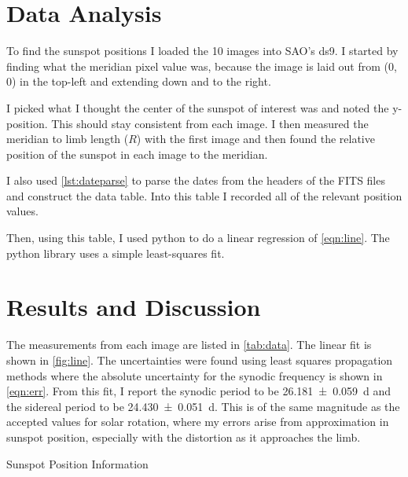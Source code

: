 \documentclass[%
aip,
jmp,
reprint,
floatfix,
]{revtex4-1}
\begin{document}
	\section{Data Analysis}
	To find the sunspot positions I loaded the 10 images into SAO's ds9. I started by finding what the meridian pixel value was, because the image is laid out from (0, 0) in the top-left and extending down and to the right. 
	
	I picked what I thought the center of the sunspot of interest was and noted the y-position. This should stay consistent from each image. I then measured the meridian to limb length ($R$) with the first image and then found the relative position of the sunspot in each image to the meridian. 
	
	I also used \autoref{lst:dateparse} to parse the dates from the headers of the FITS files and construct the data table. Into this table I recorded all of the relevant position values. 
	
	Then, using this table, I used python to do a linear regression of \autoref{eqn:line}. The python library uses a simple least-squares fit. 
	

	\section{Results and Discussion}
	
	The measurements from each image are listed in \autoref{tab:data}. The linear fit is shown in \autoref{fig:line}. The uncertainties were found using least squares propagation methods where the absolute uncertainty for the synodic frequency is shown in \autoref{eqn:err}. From this fit, I report the synodic period to be \SI{26.181 \pm .059}{\day} and the sidereal period to be \SI{24.430 \pm .051}{\day}. This is of the same magnitude as the accepted values for solar rotation, where my errors arise from approximation in sunspot position, especially with the distortion as it approaches the limb.

	\begin{table}
		\centering
		\caption{Sunspot Position Information}
		\label{tab:data}
	\end{table}
\end{document}
